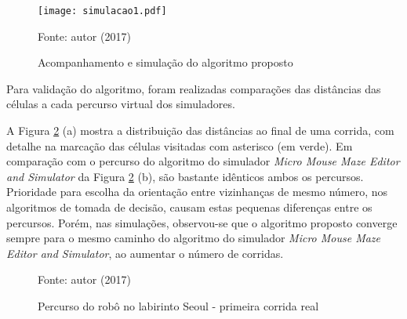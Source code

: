 \begin{figure}[!htb]
	\caption{\label{fig:simulacao1}Acompanhamento e simulação do algoritmo proposto}
	\begin{center}
		\texttt{[image: simulacao1.pdf]}
	\end{center}
	\centering
	\small Fonte: autor (2017)
\end{figure}


Para validação do algoritmo, foram realizadas comparações das distâncias das células a cada percurso virtual dos simuladores.


A Figura \ref{fig:ModelagemLab2} (a) mostra a distribuição das distâncias ao final de uma corrida, com detalhe na marcação das células visitadas com asterisco (em verde). Em comparação com o percurso do algoritmo do simulador \emph{Micro Mouse Maze Editor and Simulator} da Figura \ref{fig:ModelagemLab2} (b), são bastante idênticos ambos os percursos. Prioridade para escolha da orientação entre vizinhanças de mesmo número, nos algoritmos de tomada de decisão, causam estas pequenas diferenças entre os percursos. Porém, nas simulações, observou-se que o algoritmo proposto converge sempre para o mesmo caminho do algoritmo do simulador \emph{Micro Mouse Maze Editor and Simulator}, ao aumentar o número de corridas.


\begin{figure}[!htb]
	\caption[Percurso do robô no labirinto \emph{Seoul} - primeira corrida \emph{real}]{\label{fig:ModelagemLab2}Percurso do robô no labirinto Seoul - primeira corrida real}
	\begin{center}
		\hspace*{0.1\linewidth}
	\end{center}
	\centering
	\small Fonte: autor (2017)
\end{figure}


%
%

